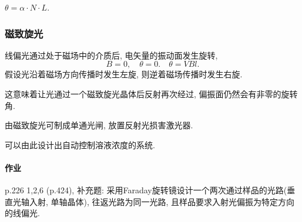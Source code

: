 \documentclass{ctexart}
\begin{document}
$\theta = \alpha\cdot N\cdot L$.


\subsubsection{磁致旋光} %
\label{ssub:磁致旋光}

线偏光通过处于磁场中的介质后, 电矢量的振动面发生旋转,
\[ B = 0,\quad \theta = 0.\quad \theta = VBl. \]
假设光沿着磁场方向传播时发生左旋, 则逆着磁场传播时发生右旋.
\begin{remark}
    这意味着让光通过一个磁致旋光晶体后反射再次经过, 偏振面仍然会有非零的旋转角.
\end{remark}
由磁致旋光可制成单通光闸, 放置反射光损害激光器. 
\begin{remark}
    可以由此设计出自动控制溶液浓度的系统.
\end{remark}

\paragraph{作业} %
\label{par:作业}

p.226 1,2,6 (p.424), 补充题: 采用Faraday旋转镜设计一个两次通过样品的光路(垂直光轴入射, 单轴晶体), 往返光路为同一光路, 且样品要求入射光偏振为特定方向的线偏光.




\end{document}
